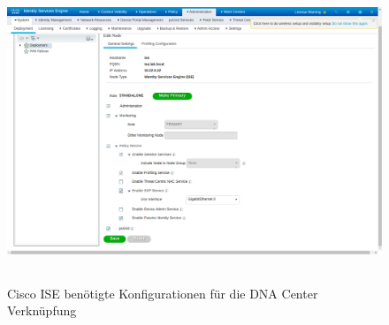 \begin{figure}[H]
	\centering
	\includegraphics[height=9cm]{img/installguide/cisco-ise.png}
	\caption{Cisco ISE benötigte Konfigurationen für die DNA Center Verknüpfung}
	\label{fig:installguide-cisco-ise}
\end{figure}

